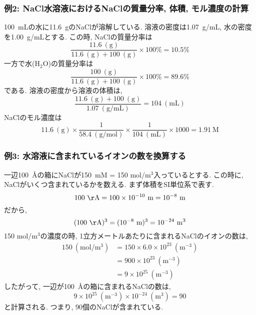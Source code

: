 \subsubsection{例2: NaCl水溶液におけるNaClの質量分率, 体積, モル濃度の計算}

100~mLの水に11.6~gのNaClが溶解している. 溶液の密度は1.07~g/mL, 
水の密度を1.00~g/mLとする. この時, NaClの質量分率は
\begin{equation}
    \frac{11.6~(\mathrm{g})}{11.6~(\mathrm{g}) + 100~(\mathrm{g})}
    \times
    100 \%
    =
    10.5 \%
\end{equation}
一方で水(H$_2$O)の質量分率は
\begin{equation}
    \frac{100~(\mathrm{g})}{11.6~(\mathrm{g}) + 100~(\mathrm{g})}
    \times
    100 \%
    =
    89.6 \%
\end{equation}
である. 溶液の密度から溶液の体積は, 
\begin{equation}
    \frac{11.6~(\mathrm{g}) + 100~(\mathrm{g})}{1.07~(\mathrm{g/mL})}
    =
    104~(\mathrm{mL})
\end{equation}
NaClのモル濃度は
\begin{equation}
    11.6~(\mathrm{g}) \times
    \frac{1}{58.4~(\mathrm{g/mol})} \times
    \frac{1}{104~(\mathrm{mL})} \times
    1000 =
    1.91~\mathrm{M}
\end{equation}


\subsubsection{例3: 水溶液に含まれているイオンの数を換算する}

一辺100~{\AA}の箱にNaClが150~mM = 150 mol/m$^3$入っているとする. 
この時に, NaClがいくつ含まれているかを数える. 
まず体積をSI単位系で表す. 
\begin{equation}
    100~\mathrm{\AA} =
    100 \times 10^{-10}~\mathrm{m} =
    10^{-8}~\mathrm{m}
\end{equation}
だから, 
\begin{equation}
    (100~\mathrm{\AA})^3 =
    (10^{-8}~\mathrm{m})^3 =
    10^{-24}~\mathrm{m}^3
\end{equation}
150 mol/m$^3$の濃度の時, 1立方メートルあたりに含まれるNaClのイオンの数は, 
\begin{align}
    150 ~(\mathrm{mol/}\mathrm{m}^3) &=
    150 \times 6.0 \times 10^{23} ~(\mathrm{m}^{-3}) \\ &=
    900 \times 10^{23}  ~(\mathrm{m}^{-3}) \\ &=
    9 \times 10^{25} ~(\mathrm{m}^{-3})
\end{align}
したがって, 一辺が100~{\AA}の箱に含まれるNaClの数は, 
\begin{equation}
    9 \times 10^{25}~(\mathrm{m}^{-3}) \times 10^{-24} ~(\mathrm{m}^3)
    = 90
\end{equation}
と計算される. つまり, 90個のNaClが含まれている. 


